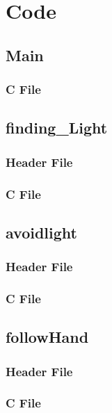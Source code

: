 \section{Code}
\subsection{Main}
\subsubsection{C File}


\subsection{finding\_Light}
\subsubsection{Header File}

\subsubsection{C File}


\subsection{avoidlight}
\subsubsection{Header File}

\subsubsection{C File}


\subsection{followHand}
\subsubsection{Header File}

\subsubsection{C File}
